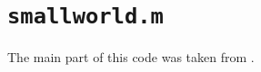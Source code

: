 \section{\texttt{smallworld.m}}
\label{sec:smallworld.m}
The main part of this code was taken from \cite{BruggerSchwirzer2011}.
